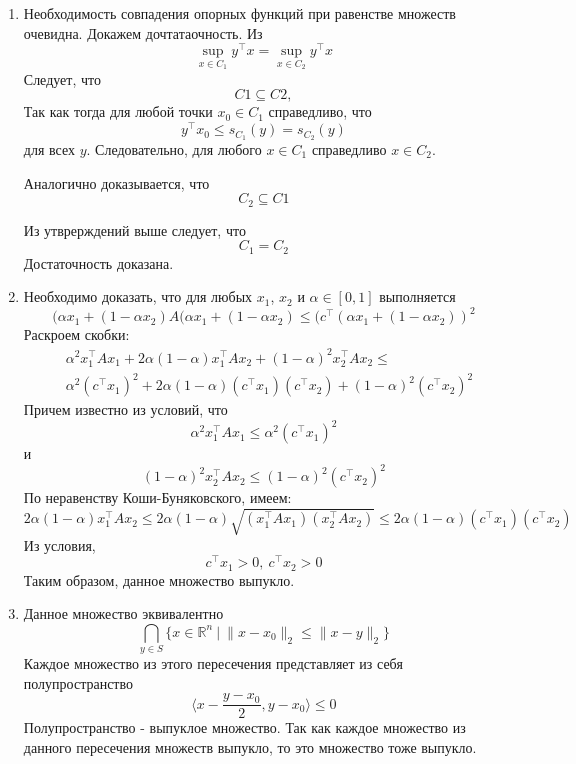 \documentclass{article}
\begin{document}
\begin{enumerate}
    \item Необходимость совпадения опорных функций при равенстве множеств очевидна. Докажем дочтатаочность. Из
          \[
              \sup_{x \in C_1} y^\top x = \sup_{x \in C_2} y^\top x
          \]
          Следует, что
          \[
              C1 \subseteq C2,
          \]
          Так как тогда для любой точки $x_0 \in C_1$ справедливо, что
          \[
              y^\top x_0 \leq s_{C_1}(y) = s_{C_2}(y)
          \]
          для всех $y$. Следовательно, для любого $x \in C_1$ справедливо $x \in C_2$.

          Аналогично доказывается, что
          \[
              C_2 \subseteq C1
          \]

          Из утврерждений выше следует, что
          \[
              C_1 = C_2
          \]
          Достаточность доказана.

    \item[5 (старое).]
        Необходимо доказать, что для любых $x_1$, $x_2$ и $\alpha \in [0, 1]$ выполняется
        \[
            (\alpha x_1 + (1 - \alpha x_2)A(\alpha x_1 + (1 - \alpha x_2) \leq (c^\top (\alpha x_1 + (1 - \alpha x_2))^2
        \]
        Раскроем скобки:
        \begin{align*}
             & \alpha^2 x_1^\top A x_1 + 2\alpha(1-\alpha)x_1^\top A x_2 + (1 - \alpha)^2 x_2^\top A x_2 \leq    \\
             & \alpha^2(c^\top x_1)^2 + 2\alpha(1-\alpha)(c^\top x_1)(c^\top x_2) + (1 - \alpha)^2(c^\top x_2)^2
        \end{align*}
        Причем известно из условий, что
        \[
            \alpha^2 x_1^\top A x_1 \leq \alpha^2(c^\top x_1)^2
        \]
        и
        \[
            (1 - \alpha)^2 x_2^\top A x_2 \leq (1 - \alpha)^2(c^\top x_2)^2
        \]
        По неравенству Коши-Буняковского, имеем:
        \[
            2\alpha(1-\alpha)x_1^\top A x_2 \leq 2\alpha(1-\alpha)
            \sqrt{(x_1^\top A x_1)(x_2^\top A x_2)} \leq 2\alpha(1-\alpha)(c^\top x_1)(c^\top x_2)
        \]
        Из условия,
        \[
            c^\top x_1 > 0, \ c^\top x_2 > 0
        \]
        Таким образом, данное множество выпукло.
    \item[5.]
        Данное множество эквивалентно
        $$
            \bigcap_{y \in S} \{x \in \mathbb{R}^n \ | \ \lVert x - x_0 \rVert_2 \leq \lVert x - y \rVert_2\}
        $$
        Каждое множество из этого пересечения представляет из себя полупространство
        $$
            \langle x - \frac{y - x_0}{2}, y - x_0 \rangle \leq 0
        $$
        Полупространство - выпуклое множество. Так как каждое множество из данного пересечения множеств выпукло, то это множество тоже выпукло.
\end{enumerate}
\end{document}

